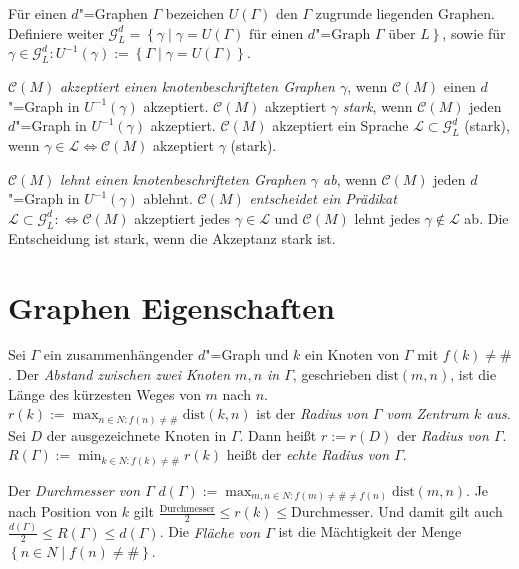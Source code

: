 \documentclass[11pt]{article}
\newcommand{\defWord}[1]{\emph{#1}}
\begin{document}
\begin{definition}
	Für einen $d$"=Graphen $\Gamma$ bezeichen $U\left(\Gamma\right)$ den $\Gamma$ zugrunde liegenden Graphen. 
	Definiere weiter $\mathcal{G}_L^d = \left\{\gamma \mid \gamma = U\left(\Gamma\right) \text{ für einen $d$"=Graph } \Gamma \text{ über } L\right\}$, sowie für $\gamma \in \mathcal{G}_L^d : U^{-1}\left(\gamma\right) := \left\{\Gamma \mid \gamma = U\left(\Gamma\right)\right\}$.
	
	$\mathcal{C}\left(M\right)$ \defWord{akzeptiert einen knotenbeschrifteten Graphen $\gamma$}, wenn $\mathcal{C}\left(M\right)$ einen $d$"=Graph in $U^{-1}\left(\gamma\right)$ akzeptiert.
	$\mathcal{C}\left(M\right)$ akzeptiert $\gamma$ \defWord{stark}, wenn $\mathcal{C}\left(M\right)$ jeden $d$"=Graph in $U^{-1}\left(\gamma\right)$ akzeptiert.
	$\mathcal{C}\left(M\right)$ akzeptiert ein Sprache $\mathcal{L} \subset \mathcal{G}_L^d$ (stark), wenn $\gamma \in \mathcal{L} \iff \mathcal{C}\left(M\right)$ akzeptiert $\gamma$ (stark). 
	
	$\mathcal{C}\left(M\right)$ \defWord{lehnt einen knotenbeschrifteten Graphen $\gamma$ ab}, wenn $\mathcal{C}\left(M\right)$ jeden $d$"=Graph in $U^{-1}\left(\gamma\right)$ ablehnt.
	$\mathcal{C}\left(M\right)$ \defWord{entscheidet ein Prädikat} $\mathcal{L} \subset \mathcal{G}_L^d :\iff \mathcal{C}\left(M\right)$ akzeptiert jedes $\gamma \in \mathcal{L}$ und $\mathcal{C}\left(M\right)$ lehnt jedes $\gamma \notin \mathcal{L}$ ab.
	Die Entscheidung ist stark, wenn die Akzeptanz stark ist. 
\end{definition}

\section{Graphen Eigenschaften}

\begin{definition}
	Sei $\Gamma$ ein zusammenhängender $d$"=Graph und $k$ ein Knoten von $\Gamma$ mit $f\left(k\right) \neq \#$.
	Der \defWord{Abstand zwischen zwei Knoten $m, n$ in $\Gamma$}, geschrieben $\text{dist}\left(m , n\right)$, ist die Länge des kürzesten Weges von $m$ nach $n$.
	$r\left(k\right) := \max_{n \in N : f\left(n\right) \neq \#} \text{dist}\left(k, n\right)$ ist der \defWord{Radius von $\Gamma$ vom Zentrum $k$ aus}.
	Sei $D$ der ausgezeichnete Knoten in $\Gamma$.
	Dann heißt $r := r\left(D\right)$ der \defWord{Radius von $\Gamma$}.
	$R\left(\Gamma\right) := \min_{k \in N : f\left(k\right) \neq \#} r\left(k\right)$ heißt der \defWord{echte Radius von $\Gamma$}.
	
	Der \defWord{Durchmesser von $\Gamma$} $d\left(\Gamma\right) := \max_{m, n \in N : f\left(m\right) \neq \# \neq f\left(n\right)} \text{dist}\left(m, n\right)$. Je nach Position von $k$ gilt $\frac{\text{Durchmesser}}{2} \le r\left(k\right) \le \text{Durchmesser}.$ Und damit gilt auch $\frac{d\left(\Gamma\right)}{2} \le R\left(\Gamma\right) \le d\left(\Gamma\right)$.
	Die \defWord{Fläche von $\Gamma$} ist die Mächtigkeit der Menge $ \left\{n \in N \mid f\left(n\right) \neq \# \right\}$.
	
\end{definition}
\end{document}
